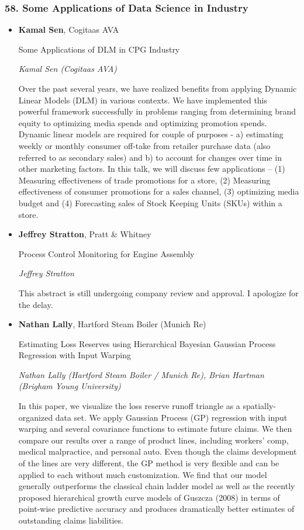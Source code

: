 \subsubsection*{58. Some Applications of Data Science in Industry}

\begin{itemize}
\item \textbf{Kamal Sen}, Cogitaas AVA

Some Applications of DLM in CPG Industry

\emph{\footnotesize Kamal Sen (Cogitaas AVA)}

Over the past several years, we have realized benefits from applying Dynamic Linear Models (DLM) in various contexts. We have implemented this powerful framework successfully in problems ranging from determining brand equity to optimizing media spends and optimizing promotion spends. Dynamic linear models are required for couple of purposes - a) estimating weekly or monthly consumer off-take from retailer purchase data (also referred to as secondary sales) and b) to account for changes over time in other marketing factors. In this talk, we will discuss few applications -- (1) Measuring effectiveness of trade promotions for a store, (2) Measuring effectiveness of consumer promotions for a sales channel, (3) optimizing media budget and (4) Forecasting sales of Stock Keeping Units (SKUs) within a store.


\item \textbf{Jeffrey Stratton}, Pratt \& Whitney

Process Control Monitoring for Engine Assembly

\emph{\footnotesize Jeffrey Stratton}

This abstract is still undergoing company review and approval.  I apologize for the delay.

\item \textbf{Nathan Lally}, Hartford Steam Boiler (Munich Re)

Estimating Loss Reserves using Hierarchical Bayesian Gaussian Process Regression with Input Warping

\emph{\footnotesize Nathan Lally (Hartford Steam Boiler / Munich Re), Brian Hartman (Brigham Young University)}

In this paper, we visualize the loss reserve runoff triangle as a spatially-organized data set. We apply Gaussian Process (GP) regression with input warping and several covariance functions to estimate future claims. We then compare our results over a range of product lines, including workers’ comp, medical malpractice, and personal auto. Even though the claims development of the lines are very different, the GP method is very flexible and can be applied to each without much customization. We find that our model generally outperforms the classical chain ladder model as well as the recently proposed hierarchical growth curve models of Guszcza (2008) in terms of point-wise predictive accuracy and produces dramatically better estimates of outstanding claims liabilities.

\end{itemize}

